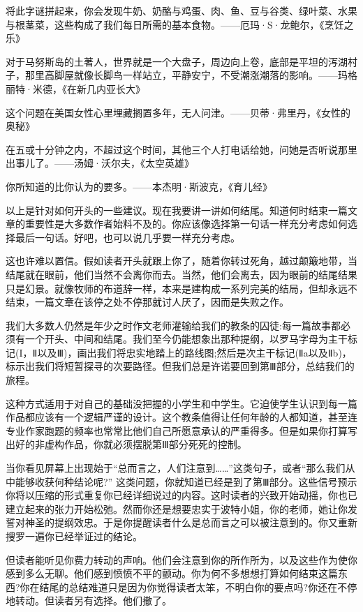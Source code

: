 将此字谜拼起来，你会发现牛奶、奶酪与鸡蛋、肉、鱼、豆与谷类、绿叶菜、水果与根茎菜，这些构成了我们每日所需的基本食物。——厄玛·S·龙鲍尔，《烹饪之乐》

对于马努斯岛的土著人，世界就是一个大盘子，周边向上卷，底部是平坦的泻湖村子，那里高脚屋就像长脚鸟一样站立，平静安宁，不受潮涨潮落的影响。——玛格丽特·米德，《在新几内亚长大》

这个问题在美国女性心里埋藏搁置多年，无人问津。——贝蒂·弗里丹，《女性的奥秘》

在五或十分钟之内，不超过这个时间，其他三个人打电话给她，问她是否听说那里出事儿了。——汤姆·沃尔夫，《太空英雄》

你所知道的比你认为的要多。——本杰明·斯波克，《育儿经》

以上是针对如何开头的一些建议。现在我要讲一讲如何结尾。知道何时结束一篇文章的重要性是大多数作者始料不及的。你应该像选择第一句话一样充分考虑如何选择最后一句话。好吧，也可以说几乎要一样充分考虑。

这也许难以置信。假如读者开头就跟上你了，随着你转过死角，越过颠簸地带，当结尾就在眼前，他们当然不会离你而去。当然，他们会离去，因为眼前的结尾结果只是幻景。就像牧师的布道辞一样，本来是建构成一系列完美的结局，但却永远不结束，一篇文章在该停之处不停那就讨人厌了，因而是失败之作。

我们大多数人仍然是年少之时作文老师灌输给我们的教条的囚徒:每一篇故事都必须有一个开头、中间和结尾。我们至今仍能想象出那种提纲，以罗马字母为主干标记(I，Ⅱ以及Ⅲ)，画出我们将忠实地踏上的路线图;然后是次主干标记(Ⅱa以及Ⅱb)，标示出我们将短暂探寻的次要路径。但我们总是许诺要回到第Ⅲ部分，总结我们的旅程。

这种方式适用于对自己的基础没把握的小学生和中学生。它迫使学生认识到每一篇作品都应该有一个逻辑严谨的设计。这个教条值得让任何年龄的人都知道，甚至连专业作家跑题的频率也常常比他们自己所愿意承认的严重得多。但是如果你打算写出好的非虚构作品，你就必须摆脱第Ⅲ部分死死的控制。

当你看见屏幕上出现始于“总而言之，人们注意到……”这类句子，或者“那么我们从中能够收获何种结论呢?” 这类问题，你就知道已经是到了第Ⅲ部分。这些信号预示你将以压缩的形式重复你已经详细说过的内容。这时读者的兴致开始动摇，你也已建立起来的张力开始松弛。然而你还是想要忠实于波特小姐，你的老师，她让你发誓对神圣的提纲效忠。于是你提醒读者什么是总而言之可以被注意到的。你又重新搜罗一遍你已经举证过的结论。

但读者能听见你费力转动的声响。他们会注意到你的所作所为，以及这些作为使你感到多么无聊。他们感到愤愤不平的颤动。你为何不多想想打算如何结束这篇东西?你在结尾的总结难道只是因为你觉得读者太笨，不明白你的要点吗?你还在不停地转动。但读者另有选择。他们撤了。

